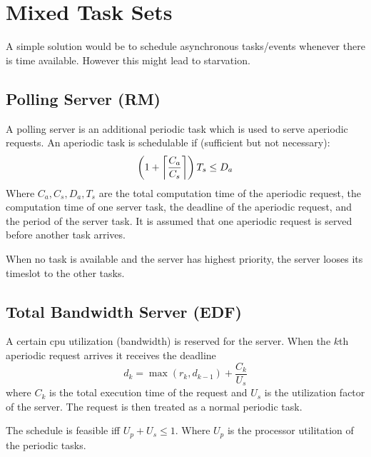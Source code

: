 \section{Mixed Task Sets}
A simple solution would be to schedule asynchronous tasks/events whenever there
is time available. However this might lead to starvation.

\subsection{Polling Server (RM)}
A polling server is an additional periodic task which is used to serve aperiodic
requests. An aperiodic task is schedulable if (sufficient but not necessary):
\begin{equation*}
	\left(1 + \left\lceil \frac{C_a}{C_s} \right\rceil\right)T_s \leq D_a
\end{equation*}
Where $C_a, C_s, D_a, T_s$ are the total computation time of the aperiodic
request, the computation time of one server task, the deadline of the aperiodic
request, and the period of the server task. It is assumed that one aperiodic
request is served before another task arrives.

When no task is available and the server has highest priority, the server looses
its timeslot to the other tasks.

\subsection{Total Bandwidth Server (EDF)}
A certain cpu utilization (bandwidth) is reserved for the server.  When the
$k$th aperiodic request arrives it receives the deadline
\begin{equation*}
	d_k = \max\left( r_k, d_{k-1} \right) + \frac{C_k}{U_s}
\end{equation*}
where $C_k$ is the total execution time of the request and $U_s$ is the
utilization factor of the server. The request is then treated as a normal
periodic task.

The schedule is feasible iff $U_p + U_s \leq 1$. Where $U_p$ is the processor
utilitation of the periodic tasks.
